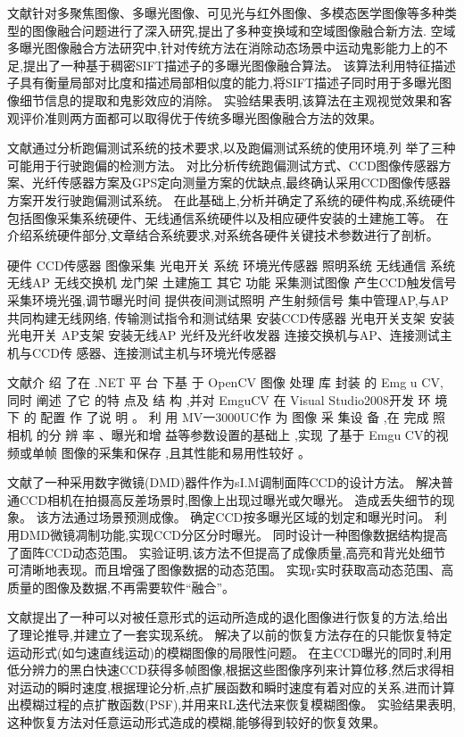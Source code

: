 \documentclass{amsart}
\begin{document}
文献\cite{刘羽}针对多聚焦图像、多曝光图像、可见光与红外图像、多模态医学图像等多种类型的图像融合问题进行了深入研究,提出了多种变换域和空域图像融合新方法.
空域多曝光图像融合方法研究中,针对传统方法在消除动态场景中运动鬼影能力上的不足,提出了一种基于稠密SIFT描述子的\textsf{多曝光图像融合算法}。
该算法利用特征描述子具有衡量局部对比度和描述局部相似度的能力,将SIFT描述子同时用于多曝光图像细节信息的提取和鬼影效应的消除。
实验结果表明,该算法在主观视觉效果和客观评价准则两方面都可以取得优于传统多曝光图像融合方法的效果。




文献\cite{杨灿}通过分析跑偏测试系统的技术要求,以及跑偏测试系统的使用环境,列
举了三种可能用于行驶跑偏的检测方法。
对比分析传统跑偏测试方式、CCD图像传感器方案、光纤传感器方案及GPS定向测量方案的优缺点,最终确认采用CCD图像传感器方案开发行驶跑偏测试系统。
在此基础上,分析并确定了系统的硬件构成,系统硬件包括图像采集系统硬件、无线通信系统硬件以及相应硬件安装的土建施工等。
在介绍系统硬件部分,文章结合系统要求,对系统各硬件关键技术参数进行了剖析。


硬件
CCD传感器
图像采集 光电开关
系统 环境光传感器
照明系统
无线通信
系统
无线AP
无线交换机
龙门架
土建施工
其它
功能
采集测试图像
产生CCD触发信号
采集环境光强,调节曝光时间
提供夜间测试照明
产生射频信号
集中管理AP,与AP共同构建无线网络,
传输测试指令和测试结果
安装CCD传感器
光电开关支架 安装光电开关
AP支架 安装无线AP
光纤及光纤收发器
连接交换机与AP、连接测试主机与CCD传
感器、连接测试主机与环境光传感器

文献\cite{王燕}介 绍 了在 .NET 平 台 下基 于 OpenCV 图像 处理 库 封装 的 Emg
u CV, 同时 阐述 了它 的特 点及 结 构 ,并对 EmguCV 在 Visual Studio2008开发 环 境 下 的 配置 作 了说 明 。
利 用 MV一3000UC作 为 图像 采 集设 备 ,在 完成 照 相机 的分 辨 率 、曝光和增 益等参数设置的基础上 ,实现 了基于 Emgu CV的视 频或单帧 图像的采集和保存 ,且其性能和易用性较好 。


文献\cite{周望}了一种采用数字微镜(DMD)器件作为sI.M调制面阵CCD的设计方法。
解决普通CCD相机在拍摄高反差场景时,图像上出现过曝光或欠曝光。
造成丢失细节的现象。
该方法通过场景预测成像。
确定CCD按多曝光区域的划定和曝光时问。
利用DMD微镜凋制功能,实现CCD分区分时曝光。
同时设计一种图像数据结构提高了面阵CCD动态范围。
实验证明,该方法不但提高了成像质量,高亮和背光处细节可清晰地表现。而且增强了图像数据的动态范围。
实现r实时获取高动态范围、高质量的图像及数据,不再需要软件“融合”。

文献\cite{付中梁}提出了一种可以对被任意形式的运动所造成的退化图像进行恢复的方法,给出了理论推导,并建立了一套实现系统。
解决了以前的恢复方法存在的只能恢复特定运动形式(如匀速直线运动)的模糊图像的局限性问题。
在主CCD曝光的同时,利用低分辨力的黑白快速CCD获得多帧图像,根据这些图像序列来计算位移,然后求得相对运动的瞬时速度,根据理论分析,点扩展函数和瞬时速度有着对应的关系,进而计算出模糊过程的点扩散函数(PSF),并用来RL迭代法来恢复模糊图像。
实验结果表明,这种恢复方法对任意运动形式造成的模糊,能够得到较好的恢复效果。
\end{document}
